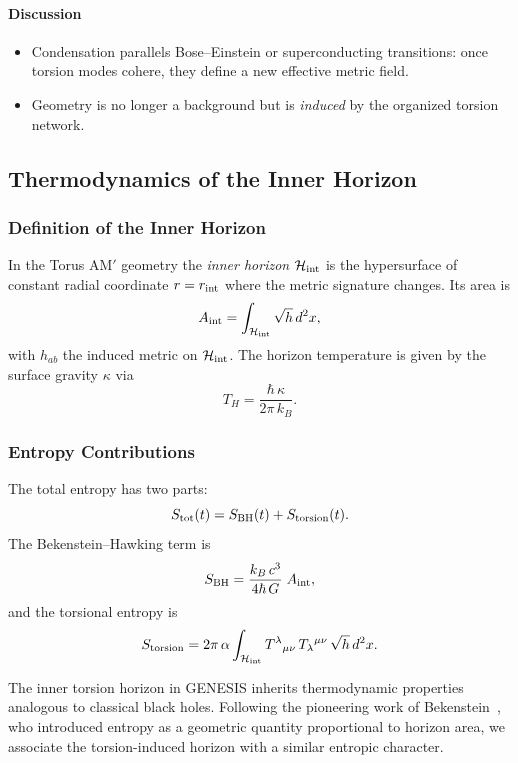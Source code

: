 \documentclass{article}
\begin{document}
\paragraph{Discussion}
\begin{itemize}
  \item Condensation parallels Bose–Einstein or superconducting transitions: once torsion modes cohere, they define a new effective metric field.
  \item Geometry is no longer a background but is \emph{induced} by the organized torsion network.
\end{itemize}

\subsection{Thermodynamics of the Inner Horizon}
\label{subsec:inner_horizon}

\subsubsection{Definition of the Inner Horizon}
In the Torus AM$'$ geometry the \emph{inner horizon} $\mathcal H_{\rm int}$ is
the hypersurface of constant radial coordinate $r=r_{\rm int}$ where the metric
signature changes.  Its area is
\[
  A_{\rm int}
  = \int_{\mathcal H_{\rm int}} \sqrt{h}\,d^2x,
\]
with $h_{ab}$ the induced metric on $\mathcal H_{\rm int}$.  The horizon
temperature is given by the surface gravity $\kappa$ via
\[
  T_H = \frac{\hbar\,\kappa}{2\pi\,k_B}.
\]

\subsubsection{Entropy Contributions}
The total entropy has two parts:
\[
  S_{\rm tot}(t)=S_{\rm BH}(t)+S_{\rm torsion}(t).
\]
The Bekenstein–Hawking term is
\[
  S_{\rm BH}
  = \frac{k_B\,c^3}{4\hbar\,G}\;A_{\rm int},
\]
and the torsional entropy is
\[
  S_{\rm torsion}
  =2\pi\,\alpha
    \int_{\mathcal H_{\rm int}}
      T^{\lambda}{}_{\mu\nu}\,T_{\lambda}{}^{\mu\nu}\,
      \sqrt{h}\,d^2x.
\]

The inner torsion horizon in GENESIS inherits thermodynamic properties analogous to classical black holes. Following the pioneering work of Bekenstein~\cite{bekenstein1973,bekenstein1974}, who introduced entropy as a geometric quantity proportional to horizon area, we associate the torsion-induced horizon with a similar entropic character.
\end{document}
